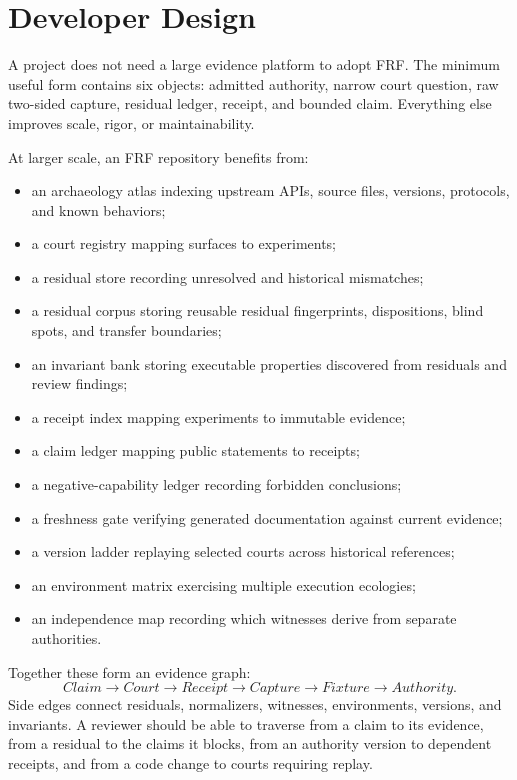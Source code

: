 \documentclass[11pt,a4paper]{article}
\newcommand{\frf}{\textsc{FRF}}
\begin{document}
\section{Developer Design}
\label{sec:scaling}

A project does not need a large evidence platform to adopt \frf{}. The minimum useful form contains six objects: admitted authority, narrow court question, raw two-sided capture, residual ledger, receipt, and bounded claim. Everything else improves scale, rigor, or maintainability.

At larger scale, an \frf{} repository benefits from:
\begin{itemize}
\item an archaeology atlas indexing upstream APIs, source files, versions, protocols, and known behaviors;
\item a court registry mapping surfaces to experiments;
\item a residual store recording unresolved and historical mismatches;
\item a residual corpus storing reusable residual fingerprints, dispositions, blind spots, and transfer boundaries;
\item an invariant bank storing executable properties discovered from residuals and review findings;
\item a receipt index mapping experiments to immutable evidence;
\item a claim ledger mapping public statements to receipts;
\item a negative-capability ledger recording forbidden conclusions;
\item a freshness gate verifying generated documentation against current evidence;
\item a version ladder replaying selected courts across historical references;
\item an environment matrix exercising multiple execution ecologies;
\item an independence map recording which witnesses derive from separate authorities.
\end{itemize}

Together these form an evidence graph:
\[
Claim
\rightarrow
Court
\rightarrow
Receipt
\rightarrow
Capture
\rightarrow
Fixture
\rightarrow
Authority.
\]
Side edges connect residuals, normalizers, witnesses, environments, versions, and invariants. A reviewer should be able to traverse from a claim to its evidence, from a residual to the claims it blocks, from an authority version to dependent receipts, and from a code change to courts requiring replay.
\end{document}
